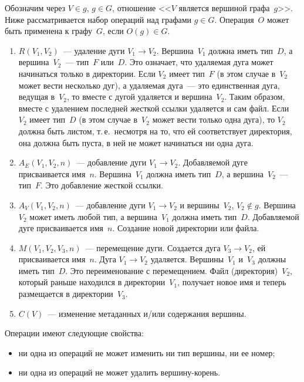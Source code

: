 \begin{multicols}{2}
     Обозначим через $V\in g$, $g\in G$, отношение <<$V$ является вершиной 
графа~$g$>>. Ниже рассматривается набор операций над графами $g\in G$. 
Операция~$O$ может быть применена к графу~$G$, если $O(g)\in G$.
     \begin{enumerate}
     \item $R(V_1, V_2)$~--- удаление дуги $V_1\rightarrow V_2$. 
Вершина~$V_1$ должна иметь тип~$D$, а вершина~$V_2$~--- тип~$F$ или~$D$. 
Это означает, что удаляемая дуга может начинаться только в директории. Если 
$V_2$ имеет тип~$F$ (в этом случае в~$V_2$ может вести несколько дуг), а 
удаляемая дуга~--- это единственная дуга, ведущая в~$V_2$, то вместе с дугой 
удаляется и вершина~$V_2$. Таким образом, вместе с удалением последней 
жесткой ссылки удаляется и сам файл. Если~$V_2$ имеет тип~$D$ (в этом 
случае в~$V_2$ может вести только одна дуга), то $V_2$ должна быть листом, 
т.\,е.\ несмотря на то, что ей соответствует директория, она должна быть пуста, 
в ней не может начинаться ни одна дуга. 
\item $A_E(V_1, V_2, n)$~--- добавление дуги $V_1\rightarrow V_2$. 
До\-бав\-ля\-емой дуге присваивается имя~$n$. Вершина~$V_1$ должна иметь 
тип~$D$, а вершина~$V_2$~--- тип~$F$. Это добавление жесткой ссылки.
\item $A_V(V_1, V_2, n)$~--- добавление дуги $V_1\rightarrow V_2$ и 
вершины~$V_2$, $V_2\notin g$. Вершина $V_2$ может иметь любой тип, а 
вершина~$V_1$ должна иметь тип~$D$. До\-бав\-ля\-емой дуге присваивается 
имя~$n$. Создание новой директории или файла.
\item $M(V_1, V_2, V_3, n)$~--- перемещение дуги. Создается дуга 
$V_3\rightarrow V_2$, ей присваивается имя~$n$. Дуга $V_1\rightarrow V_2$ 
удаляется. Вершины~$V_1$ и~$V_3$ должны иметь тип~$D$. Это 
переименование с перемещением. Файл (директория)~$V_2$, который 
раньше находился в директории~$V_1$, получает новое имя и теперь 
размещается в директории~$V_3$.
\item $C(V)$~--- изменение метаданных и/или содержания вершины. 
\end{enumerate}
      
      Операции имеют следующие свойства:
      \begin{itemize}
\item ни одна из операций не может изменить ни тип вершины, ни ее номер;
\item ни одна из операций не может удалить вер\-ши\-ну-корень. 
\end{itemize}


\end{multicols}
